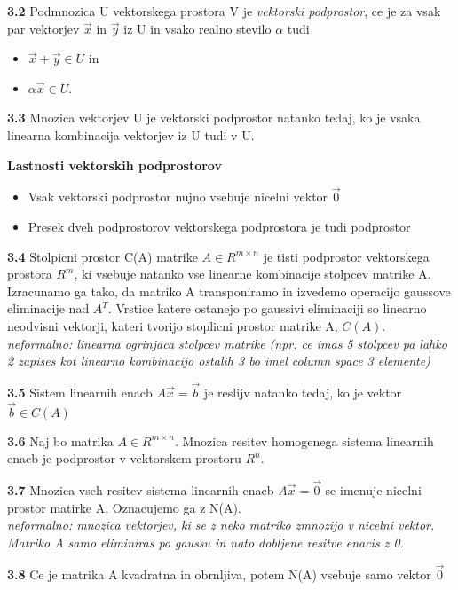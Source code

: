 \documentclass{article}
\begin{document}
\begin{multicols}{3}
\textbf{3.2} Podmnozica U vektorskega prostora V je \textit{vektorski podprostor}, ce je za
vsak par vektorjev $\vec{x}$ in $\vec{y}$ iz U in vsako realno stevilo $\alpha$ tudi
\begin{itemize}
    \item $\vec{x} + \vec{y} \in U$ in
    \item $\alpha\vec{x} \in U$.
\end{itemize}

\textbf{3.3} Mnozica vektorjev U je vektorski podprostor natanko tedaj, ko je vsaka linearna
kombinacija vektorjev iz U tudi v U.

\textbf{Lastnosti vektorskih podprostorov}
\begin{itemize}
    \item Vsak vektorski podprostor nujno vsebuje nicelni vektor $\vec{0}$
    \item Presek dveh podprostorov vektorskega podprostora je tudi podprostor
\end{itemize}

\textbf{3.4} Stolpicni prostor C(A) matrike $A \in R^{m \times n}$ je tisti podprostor
vektorskega prostora $R^{m}$, ki vsebuje natanko vse linearne kombinacije stolpcev matrike A.\\
Izracunamo ga tako, da matriko A transponiramo in izvedemo operacijo gaussove eliminacije nad $A^{T}$. Vrstice katere ostanejo po gaussivi eliminaciji
so linearno neodvisni vektorji, kateri tvorijo stoplicni prostor matrike A, $C(A)$.
\textit{neformalno: linearna ogrinjaca stolpcev matrike (npr. ce imas 5 stolpcev pa lahko 2 zapises kot linearno kombinacijo ostalih 3 bo imel column space 3 elemente)}

\textbf{3.5} Sistem linearnih enacb $A\vec{x} = \vec{b}$ je reslijv natanko tedaj, ko je vektor
$\vec{b} \in C(A)$

\textbf{3.6} Naj bo matrika $A \in R^{m \times n}$. Mnozica resitev homogenega sistema linearnih
enacb je podprostor v vektorskem prostoru $R^{n}$.

\textbf{3.7} Mnozica vseh resitev sistema linearnih enacb $A\vec{x} = \vec{0}$ se imenuje nicelni
prostor matirke A. Oznacujemo ga z N(A).\\
\textit{neformalno: mnozica vektorjev, ki se z neko matriko zmnozijo v nicelni vektor. Matriko A samo eliminiras po gaussu in nato dobljene resitve enacis z 0.}

\textbf{3.8} Ce je matrika A kvadratna in obrnljiva, potem N(A) vsebuje samo vektor $\vec{0}$


\end{multicols}
\end{document}
